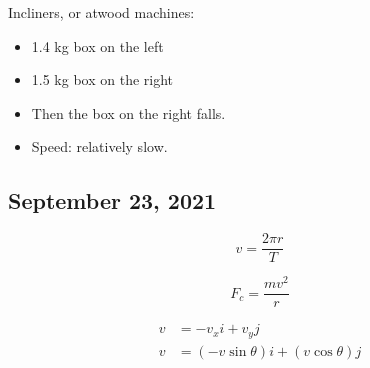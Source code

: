 \documentclass{scrreprt} %
\begin{document}
Incliners, or atwood machines:

\begin{itemize}
	\item 1.4 kg box on the left
	\item 1.5 kg box on the right
	\item Then the box on the right falls.
	\item Speed: relatively slow.
\end{itemize}

\subsection{September 23, 2021}

\begin{theorem}
	$$v = \frac{2\pi r}{T}$$
\end{theorem}

\begin{theorem}

$$F_c = \frac{mv^2}{r}$$

\begin{align*}
	v &= -v_xi + v_yj \\ 
	v &= (-v\sin \theta)i + (v\cos \theta)j \\
\end{align*}
	
\end{theorem}
\end{document}
